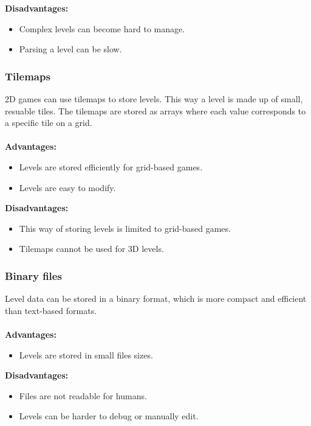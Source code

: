 \noindent\textbf{Disadvantages:}
\begin{itemize}
    \item Complex levels can become hard to manage.
    \item Parsing a level can be slow.
\end{itemize}

\subsubsection{Tilemaps}
2D games can use tilemaps to store levels. This way a level is made up of small, resuable tiles.
The tilemaps are stored as arrays where each value corresponds to a specific tile on a grid.
\\\\
\textbf{Advantages:}
\begin{itemize}
    \item Levels are stored efficiently for grid-based games.
    \item Levels are easy to modify.
\end{itemize}

\noindent\textbf{Disadvantages:}
\begin{itemize}
    \item This way of storing levels is limited to grid-based games.
    \item Tilemaps cannot be used for 3D levels.
\end{itemize}

\subsubsection{Binary files}
Level data can be stored in a binary format, which is more compact and efficient than text-based formats.
\\\\
\textbf{Advantages:}
\begin{itemize}
    \item Levels are stored in small files sizes.
\end{itemize}
\noindent\textbf{Disadvantages:}
\begin{itemize}
    \item Files are not readable for humans.
    \item Levels can be harder to debug or manually edit.
\end{itemize}

